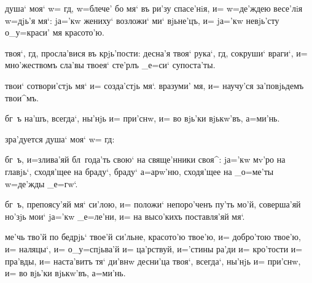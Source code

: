  душа` моя` w= гд, w=блече' бо мя` въ 
ри'зу спасе'нiя, и= w=де'ждею весе'лiя w=дjь'я мя`: 
jа='кw жениху` возложи` ми` вjьне'цъ, и= jа='кw невjь'сту 
о_у=краси' мя красото'ю.


 твоя`, гд, просла'вися въ крjь'пости: 
десна'я твоя` рука`, гд, сокруши` враги`, и= 
мно'жествомъ сла'вы твоея` сте'рлъ _е=си` супоста'ты.

  твои` сотвори'стjь 
мя` и= созда'стjь мя`. вразуми' мя, и= научу'ся 
за'повjьдемъ твои^мъ.



 бг~ъ на'шъ, всегда`, ны'нjь и= при'снw, 
и= во вjь'ки вjькw'въ, а=ми'нь.

з\-ра'\-ду\-ет\-ся душа` моя` 
w= гд: 


 бг~ъ, и=злива'яй бл~года'ть свою` на 
свяще'нники своя^: jа='кw мv'ро на главjь`, сходя'щее на 
браду`, браду` а=арw'ню, сходя'щее на _о=ме'ты w=де'жды 
_е=гw`.


 бг~ъ, препоясу'яй мя` си'лою, и= положи` 
непоро'ченъ пу'ть мо'й, соверша'яй но'зjь мои` jа='кw 
_е=ле'ни, и= на высо'кихъ поставля'яй мя`.



 ме'чь тво'й по бедрjь` твое'й си'льне, 
красото'ю твое'ю, и= добро'тою твое'ю, и= наляцы`, и= 
о_у=спjьва'й и= ца'рствуй, и='стины ра'ди и= кро'тости и= 
пра'вды, и= наста'витъ тя` ди'внw десни'ца твоя`, 
всегда`, ны'нjь и= при'снw, и= во вjь'ки вjькw'въ, 
а=ми'нь.

